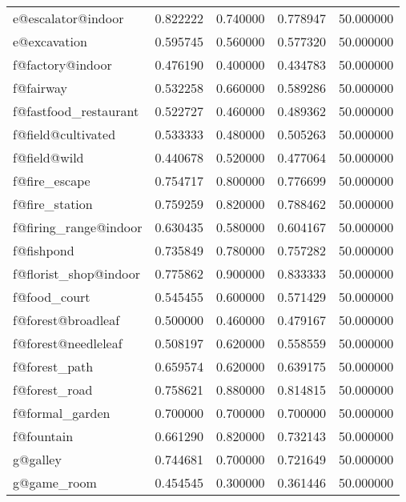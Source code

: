 \begin{tabular}{lrrrr}
e@escalator@indoor            &   0.822222 &  0.740000 &  0.778947 &     50.000000 \\
e@excavation                  &   0.595745 &  0.560000 &  0.577320 &     50.000000 \\
f@factory@indoor              &   0.476190 &  0.400000 &  0.434783 &     50.000000 \\
f@fairway                     &   0.532258 &  0.660000 &  0.589286 &     50.000000 \\
f@fastfood\_restaurant         &   0.522727 &  0.460000 &  0.489362 &     50.000000 \\
f@field@cultivated            &   0.533333 &  0.480000 &  0.505263 &     50.000000 \\
f@field@wild                  &   0.440678 &  0.520000 &  0.477064 &     50.000000 \\
f@fire\_escape                 &   0.754717 &  0.800000 &  0.776699 &     50.000000 \\
f@fire\_station                &   0.759259 &  0.820000 &  0.788462 &     50.000000 \\
f@firing\_range@indoor         &   0.630435 &  0.580000 &  0.604167 &     50.000000 \\
f@fishpond                    &   0.735849 &  0.780000 &  0.757282 &     50.000000 \\
f@florist\_shop@indoor         &   0.775862 &  0.900000 &  0.833333 &     50.000000 \\
f@food\_court                  &   0.545455 &  0.600000 &  0.571429 &     50.000000 \\
f@forest@broadleaf            &   0.500000 &  0.460000 &  0.479167 &     50.000000 \\
f@forest@needleleaf           &   0.508197 &  0.620000 &  0.558559 &     50.000000 \\
f@forest\_path                 &   0.659574 &  0.620000 &  0.639175 &     50.000000 \\
f@forest\_road                 &   0.758621 &  0.880000 &  0.814815 &     50.000000 \\
f@formal\_garden               &   0.700000 &  0.700000 &  0.700000 &     50.000000 \\
f@fountain                    &   0.661290 &  0.820000 &  0.732143 &     50.000000 \\
g@galley                      &   0.744681 &  0.700000 &  0.721649 &     50.000000 \\
g@game\_room                   &   0.454545 &  0.300000 &  0.361446 &     50.000000 \\

\end{tabular}
